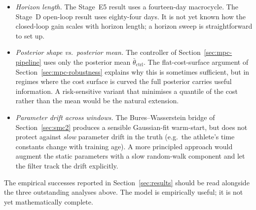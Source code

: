 \begin{itemize}
  \item \emph{Horizon length.} The Stage~E5 result uses a fourteen-day
        macrocycle. The Stage~D open-loop result uses eighty-four days.
        It is not yet known how the closed-loop gain scales with horizon
        length; a horizon sweep is straightforward to set up.
  \item \emph{Posterior shape vs.\ posterior mean.} The controller of
        Section~\ref{sec:mpc-pipeline} uses only the posterior mean
        $\bar\theta_{\mathrm{ctrl}}$. The flat-cost-surface argument of
        Section~\ref{sec:mpc-robustness} explains why this is sometimes
        sufficient, but in regimes where the cost surface is curved the
        full posterior carries useful information. A risk-sensitive
        variant that minimises a quantile of the cost rather than the
        mean would be the natural extension.
  \item \emph{Parameter drift across windows.} The Bures--Wasserstein
        bridge of Section~\ref{sec:smc2} produces a sensible
        Gaussian-fit warm-start, but does not protect against
        \emph{slow} parameter drift in the truth (e.g.\ the athlete's
        time constants change with training age). A more principled
        approach would augment the static parameters with a slow
        random-walk component and let the filter track the drift
        explicitly.
\end{itemize}

\medskip
\noindent
The empirical successes reported in Section~\ref{sec:results} should be
read alongside the three outstanding analyses above. The model is
empirically useful; it is not yet mathematically complete.
